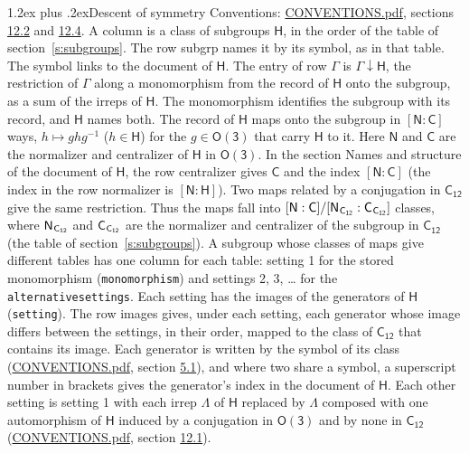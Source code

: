 \documentclass[10pt,a4paper]{article}
\makeatletter
\renewcommand\section{\@startsection{section}{1}{\z@}{-3ex plus -1ex minus -.2ex}%
  {1.2ex plus .2ex}{\normalfont\large\sffamily\bfseries\color{parttitle}}}
\numberwithin{equation}{section}
\newcommand{\grp}[1]{\mathsf{#1}}
\newcommand{\grpindex}[2]{[#1 : #2]}
\newcommand{\restr}[2]{#1\!\downarrow#2}
\newcommand{\hairsp}{\mkern1mu}
\makeatother
\begin{document}
\section{Descent of symmetry}\label{s:subduction}
Conventions: \href{../../CONVENTIONS.pdf}{CONVENTIONS.pdf}, sections \href{../../CONVENTIONS.pdf\#conv.12.2}{12.2} and \href{../../CONVENTIONS.pdf\#conv.12.4}{12.4}.
A column is a class of subgroups $\grp{H}$, in the order of the table of section~\ref{s:subgroups}. The row subgrp names it by its symbol, as in that table. The symbol links to the document of $\grp{H}$. The entry of row $\Gamma$ is $\restr{\Gamma}{\grp{H}}$, the restriction of $\Gamma$ along a monomorphism from the record of $\grp{H}$ onto the subgroup, as a sum of the irreps of $\grp{H}$. The monomorphism identifies the subgroup with its record, and $\grp{H}$ names both. \label{n:group.normalizer.o3}\label{n:group.centralizer.o3}The record of $\grp{H}$ maps onto the subgroup in $\grpindex{\grp{N}}{\grp{C}}$ ways, $h \mapsto g h g^{-1}$ ($h \in \grp{H}$) for the $g \in \grp{O(3)}$ that carry $\grp{H}$ to it. Here $\grp{N}$ and $\grp{C}$ are the normalizer and centralizer of $\grp{H}$ in \href{O3.pdf}{$\grp{O(3)}$}. In the section Names and structure of the document of $\grp{H}$, the row centralizer gives $\grp{C}$ and the index $\grpindex{\grp{N}}{\grp{C}}$ (the index in the row normalizer is $\grpindex{\grp{N}}{\grp{H}}$). Two maps related by a conjugation in $\grp{C_{12}}$ give the same restriction. Thus the maps fall into $\grpindex{\grp{N}}{\grp{C}}/\grpindex{\grp{N}_{\hairsp \grp{C_{12}}}}{\grp{C}_{\hairsp \grp{C_{12}}}}$ classes, where $\grp{N}_{\hairsp \grp{C_{12}}}$ and $\grp{C}_{\hairsp \grp{C_{12}}}$ are the normalizer and centralizer of the subgroup in $\grp{C_{12}}$ (the table of section~\ref{s:subgroups}). \label{n:head.setting}A subgroup whose classes of maps give different tables has one column for each table: setting 1 for the stored monomorphism (\texttt{monomorphism}) and settings 2, 3, \dots{} for the \texttt{alternativesettings}. Each setting has the images of the generators of $\grp{H}$ (\texttt{setting}). \label{n:head.images}The row images gives, under each setting, each generator whose image differs between the settings, in their order, mapped to the class of $\grp{C_{12}}$ that contains its image. Each generator is written by the symbol of its class (\href{../../CONVENTIONS.pdf}{CONVENTIONS.pdf}, section \href{../../CONVENTIONS.pdf\#conv.5.1}{5.1}), and where two share a symbol, a superscript number in brackets gives the generator's index in the document of $\grp{H}$. \label{n:irrep.Delta}Each other setting is setting 1 with each irrep $\Lambda$ of $\grp{H}$ replaced by $\Lambda$ composed with one automorphism of $\grp{H}$ induced by a conjugation in \href{O3.pdf}{$\grp{O(3)}$} and by none in $\grp{C_{12}}$ (\href{../../CONVENTIONS.pdf}{CONVENTIONS.pdf}, section \href{../../CONVENTIONS.pdf\#conv.12.1}{12.1}).
\end{document}
